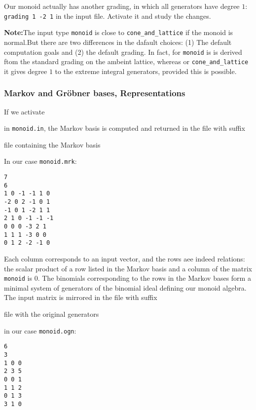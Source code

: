 Our monoid actually has another grading, in which all generators have degree $1$: \verb|grading 1 -2 1| in the input file. Activate it and study the changes.

\textbf{Note:}\enspace The input type \verb|monoid| is close to \verb|cone_and_lattice| if the monoid is normal.But there are two differences in the dafault choices: (1) The default computation goals and (2) the default grading. In fact, for \verb|monoid| is is derived ftom the standard grading on the ambeint lattice, whereas or \verb|cone_and_lattice| it gives degree $1$ to the extreme integral generators, provided this is possible.

\subsubsection{Markov and Gröbner bases, Representations}\label{markov}
If we activate
\begin{itemize}
	\itemtt[MarkovBasis]
\end{itemize}
in \verb|monoid.in|, the Markov basis is computed and returned in the file with suffix 
\begin{itemize}
	\itemtt[mrk] file containing the Markov basis	
\end{itemize}
In our case \verb|monoid.mrk|:
\begin{Verbatim}
7
6
1 0 -1 -1 1 0 
-2 0 2 -1 0 1 
-1 0 1 -2 1 1 
2 1 0 -1 -1 -1 
0 0 0 -3 2 1 
1 1 1 -3 0 0 
0 1 2 -2 -1 0
\end{Verbatim}
Each column corresponds to an input vector, and the rows aee indeed relations: the scalar product of a row listed in the Markov basis and a column of the matrix \verb|monoid| is $0$. The binomials corresponding to the rows in the Markov bases form a minimal system of generators of the binomial ideal defining our monoid algebra. The input matrix is mirrored in the file with suffix 
\begin{itemize}
	\itemtt[ogn] file with the original generators
\end{itemize}
in our case \verb|monoid.ogn|:
\begin{Verbatim}
6
3
1 0 0 
2 3 5 
0 0 1 
1 1 2 
0 1 3 
3 1 0
\end{Verbatim}

